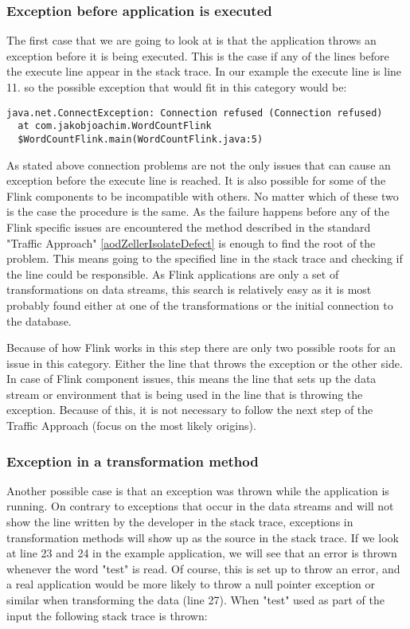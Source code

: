 \subsubsection{Exception before application is executed}
The first case that we are going to look at is that the application throws an exception before it is being executed. This is the case if any of the lines before the execute line appear in the stack trace. In our example the execute line is line 11. so the possible exception that would fit in this category would be:

\begin{lstlisting}[caption={Connection Exception}]
java.net.ConnectException: Connection refused (Connection refused)
  at com.jakobjoachim.WordCountFlink
  $WordCountFlink.main(WordCountFlink.java:5)
\end{lstlisting}

As stated above connection problems are not the only issues that can cause an exception before the execute line is reached. It is also possible for some of the Flink components to be incompatible with others. No matter which of these two is the case the procedure is the same. As the failure happens before any of the Flink specific issues are encountered the method described in the standard "Traffic Approach" \ref{aodZellerIsolateDefect} is enough to find the root of the problem. This means going to the specified line in the stack trace and checking if the line could be responsible. As Flink applications are only a set of transformations on data streams, this search is relatively easy as it is most probably found either at one of the transformations or the initial connection to the database.

Because of how Flink works in this step there are only two possible roots for an issue in this category. Either the line that throws the exception or the other side. In case of Flink component issues, this means the line that sets up the data stream or environment that is being used in the line that is throwing the exception. Because of this, it is not necessary to follow the next step of the Traffic Approach (focus on the most likely origins).

\subsubsection{Exception in a transformation method}
Another possible case is that an exception was thrown while the application is running. On contrary to exceptions that occur in the data streams and will not show the line written by the developer in the stack trace, exceptions in transformation methods will show up as the source in the stack trace. If we look at line 23 and 24 in the example application, we will see that an error is thrown whenever the word "test" is read. Of course, this is set up to throw an error, and a real application would be more likely to throw a null pointer exception or similar when transforming the data (line 27). When "test" used as part of the input the following stack trace is thrown:

